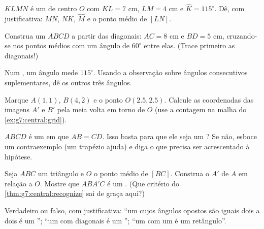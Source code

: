 \begin{exercise}[$\star$]\label{exo:g7:central:4}
$KLMN$ é um  de centro $O$ com $KL = 7$ cm, $LM = 4$ cm e
$\widehat K = 115^\circ$. Dê, com justificativa: $MN$, $NK$,
$\widehat M$ e o ponto médio de $[LN]$.
\end{exercise}

\begin{exercise}[$\star$]\label{exo:g7:central:5}
Construa um  $ABCD$ a partir das diagonais: $AC = 8$ cm e
$BD = 5$ cm, cruzando-se nos pontos médios com um ângulo de $60^\circ$
entre elas. (Trace primeiro as diagonais!)
\end{exercise}

\begin{exercise}[$\star$]\label{exo:g7:central:6}
Num , um ângulo mede $115^\circ$. Usando a observação
sobre ângulos consecutivos suplementares, dê os outros três ângulos.
\end{exercise}

\begin{exercise}[$\star\star$]\label{exo:g7:central:7}
Marque $A(1, 1)$, $B(4, 2)$ e o ponto $O(2.5, 2.5)$. Calcule as
coordenadas das imagens $A'$ e $B'$ pela meia volta em torno de $O$
(use a contagem na malha do \cref{ex:g7:central:grid}).
\end{exercise}

\begin{exercise}[$\star\star$]\label{exo:g7:central:8}
$ABCD$ é um  em que $AB = CD$. Isso basta para que ele seja
um ? Se não, esboce um contraexemplo (um trapézio
 ajuda) e diga o que precisa ser acrescentado à hipótese.
\end{exercise}

\begin{exercise}[$\star\star$]\label{exo:g7:central:9}
Seja $ABC$ um triângulo e $O$ o ponto médio de $[BC]$. Construa o
 $A'$ de $A$ em relação a $O$. Mostre que $ABA'C$ é um
. (Que critério do \cref{thm:g7:central:recognize} sai de
graça aqui?)
\end{exercise}

\begin{exercise}[$\star\star$]\label{exo:g7:central:10}
Verdadeiro ou falso, com justificativa: ``um  cujos ângulos
opostos são iguais dois a dois é um ''; ``um 
com diagonais  é um ''; ``um  com um
 é um retângulo''.
\end{exercise}


